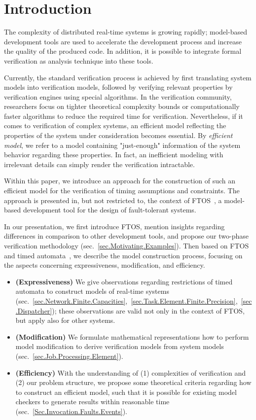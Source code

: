\documentclass[10pt, a4paper, onecolumn, conference, compsocconf]{IEEEtran}
\begin{document}
\section{Introduction}

The complexity of distributed real-time systems is growing rapidly; model-based development tools are used to accelerate the development process and increase the quality of the produced code. In addition, it is possible to integrate formal verification as analysis technique into these tools.



Currently, the standard verification process is achieved by first translating system models into verification models, followed by verifying relevant properties by verification engines using special algorithms. In the verification community, researchers focus on tighter theoretical complexity bounds or computationally faster algorithms to reduce the required time for verification. Nevertheless, if it comes to verification of complex systems, an efficient model reflecting the properties of the system under consideration becomes essential. By \emph{efficient model}, we refer to a model containing "just-enough" information of the system behavior regarding these properties. In fact, an inefficient modeling with irrelevant details can simply render the verification intractable.

Within this paper, we introduce an approach for the construction of such an efficient model for the verification of timing assumptions and constraints. The approach is presented in, but not restricted to, the context of FTOS~\cite{buckl:2008}, a model-based development tool for the design of fault-tolerant systems.

In our presentation, we first introduce FTOS, mention insights regarding differences in comparison to other development tools, and propose our two-phase verification methodology (sec.~\ref{sec.Motivating.Examples}).
Then based on FTOS and timed automata~\cite{alur:1994:tta}, we describe the model construction process, focusing on the aspects concerning expressiveness, modification, and efficiency.
\begin{itemize}
\item \textbf{(Expressiveness)} We give observations regarding restrictions of timed automata to construct models of real-time systems (sec.~\ref{sec.Network.Finite.Capacities},~\ref{sec.Task.Element.Finite.Precision},~\ref{sec.Dispatcher}); these observations are valid not only in the context of FTOS, but apply also for other systems.
\item \textbf{(Modification)} We formulate mathematical representations how to perform model modification to derive verification models from system models (sec.~\ref{sec.Job.Processing.Element}).
\item \textbf{(Efficiency)} With the understanding of (1) complexities of verification and (2) our problem structure, we propose some theoretical criteria regarding how to construct an efficient model, such that it is possible for existing model checkers to generate results within reasonable time (sec.~\ref{Sec.Invocation.Faults.Events}).
\end{itemize}
\end{document}
